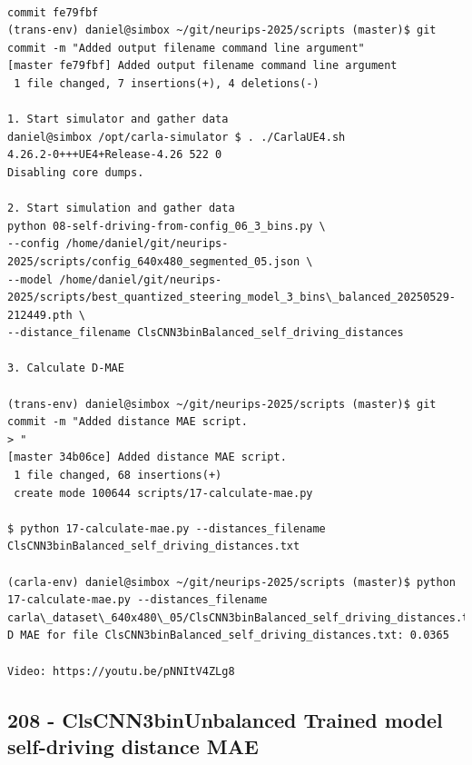 \begin{verbatim}

commit fe79fbf
(trans-env) daniel@simbox ~/git/neurips-2025/scripts (master)$ git commit -m "Added output filename command line argument"
[master fe79fbf] Added output filename command line argument
 1 file changed, 7 insertions(+), 4 deletions(-)

1. Start simulator and gather data
daniel@simbox /opt/carla-simulator $ . ./CarlaUE4.sh 
4.26.2-0+++UE4+Release-4.26 522 0
Disabling core dumps.

2. Start simulation and gather data
python 08-self-driving-from-config_06_3_bins.py \
--config /home/daniel/git/neurips-2025/scripts/config_640x480_segmented_05.json \
--model /home/daniel/git/neurips-2025/scripts/best_quantized_steering_model_3_bins\_balanced_20250529-212449.pth \
--distance_filename ClsCNN3binBalanced_self_driving_distances

3. Calculate D-MAE

(trans-env) daniel@simbox ~/git/neurips-2025/scripts (master)$ git commit -m "Added distance MAE script.
> "
[master 34b06ce] Added distance MAE script.
 1 file changed, 68 insertions(+)
 create mode 100644 scripts/17-calculate-mae.py

$ python 17-calculate-mae.py --distances_filename ClsCNN3binBalanced_self_driving_distances.txt

(carla-env) daniel@simbox ~/git/neurips-2025/scripts (master)$ python 17-calculate-mae.py --distances_filename carla\_dataset\_640x480\_05/ClsCNN3binBalanced_self_driving_distances.txt
D MAE for file ClsCNN3binBalanced_self_driving_distances.txt: 0.0365

Video: https://youtu.be/pNNItV4ZLg8

\end{verbatim}

\subsection{208 - ClsCNN3binUnbalanced Trained model self-driving distance MAE}
\label{app_res:208}

